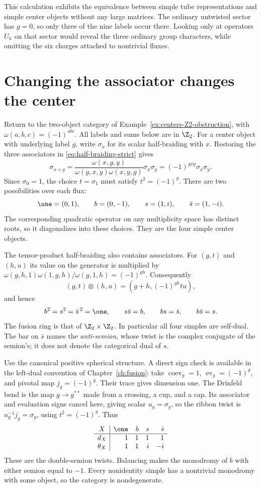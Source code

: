 This calculation exhibits the equivalence between simple tube
representations and simple center objects without any large matrices.
The ordinary untwisted sector has $g=0$, so only three of the nine
labels occur there.  Looking only at operators $U_h$ on that sector
would reveal the three ordinary group characters, while omitting the
six charges attached to nontrivial fluxes.

\section{Changing the associator changes the center}

\begin{example}
\label{ex:centers-double-semion}
Return to the two-object category of
Example~\ref{ex:centers-Z2-obstruction}, with
$\omega(a,b,c)=(-1)^{abc}$. All labels and sums below are in
$\Z_2$. For a center object with underlying label $g$, write
$\sigma_x$ for its scalar half-braiding with $x$.
Restoring the three associators in
\eqref{eq:half-braiding-strict} gives
\[
 \sigma_{x+y}
 =\frac{\omega(x,g,y)}
        {\omega(g,x,y)\omega(x,y,g)}\sigma_x\sigma_y
 =(-1)^{gxy}\sigma_x\sigma_y.
\]
Since $\sigma_0=1$, the choice $t=\sigma_1$ must satisfy
$t^2=(-1)^g$. There are two possibilities over each flux:
\[
 \one=(0,1),\qquad b=(0,-1),\qquad
 s=(1,i),\qquad \bar s=(1,-i).
\]
The corresponding quadratic operator on any multiplicity space
has distinct roots, so it diagonalizes into these choices.
They are the four simple center objects.

The tensor-product half-braiding also contains associators.
For $(g,t)$ and $(h,u)$ its value on the generator is
multiplied by
$\omega(g,h,1)\omega(1,g,h)/\omega(g,1,h)=(-1)^{gh}$.
Consequently
\[
 (g,t)\otimes(h,u)=(g+h,(-1)^{gh}tu),
\]
and hence
\[
 b^2=s^2=\bar s^{\,2}=\one,\qquad
 s\bar s=b,\qquad bs=\bar s,\qquad b\bar s=s.
\]
The fusion ring is that of $\Z_2\times\Z_2$.
In particular all four simples are self-dual. The bar on
$\bar s$ names the \emph{anti-semion}, whose twist is the
complex conjugate of the semion's; it does not denote the
categorical dual of $s$.

Use the canonical positive spherical structure. A direct sign
check is available in the left-dual convention of
Chapter~\ref{ch:fusion}: take
$\operatorname{coev}_g=1$,
$\operatorname{ev}_g=(-1)^g$, and pivotal map $j_g=(-1)^g$.
Their trace gives dimension one. The Drinfeld bend is the map
$g\to g^{**}$ made from a crossing, a cup, and a cap.
Its associator and evaluation signs cancel here, giving scalar
$u_g=\sigma_g$, so the ribbon twist is
$u_g^{-1}j_g=\sigma_g$, using $t^2=(-1)^g$.
Thus
\[
\begin{array}{c|rrrr}
 X&\one&b&s&\bar s\\\hline
 d_X&1&1&1&1\\
 \theta_X&1&1&i&-i
\end{array}
\]
These are the double-semion twists. Balancing makes the
monodromy of $b$ with either semion equal to $-1$.
Every nonidentity simple has a nontrivial monodromy with some
object, so the category is nondegenerate.


\end{example}
